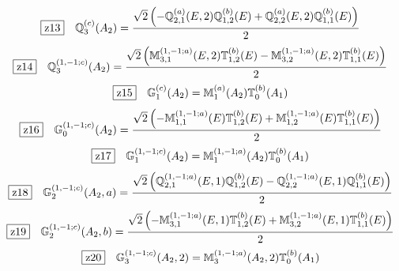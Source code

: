 \documentclass[fleqn,10pt,landscape]{jsarticle}
\begin{document}
\begin{dmath*}
\hspace*{3mm}\fbox{z13}\quad \mathbb{Q}_{3}^{(c)}(A_{2})=\frac{\sqrt{2} \left(- \mathbb{Q}_{2,1}^{(a)}(E,2) \mathbb{Q}_{1,2}^{(b)}(E) + \mathbb{Q}_{2,2}^{(a)}(E,2) \mathbb{Q}_{1,1}^{(b)}(E)\right)}{2}
\end{dmath*}
\begin{dmath*}
\hspace*{3mm}\fbox{z14}\quad \mathbb{Q}_{3}^{(1,-1;c)}(A_{2})=\frac{\sqrt{2} \left(\mathbb{M}_{3,1}^{(1,-1;a)}(E,2) \mathbb{T}_{1,2}^{(b)}(E) - \mathbb{M}_{3,2}^{(1,-1;a)}(E,2) \mathbb{T}_{1,1}^{(b)}(E)\right)}{2}
\end{dmath*}
\begin{dmath*}
\hspace*{3mm}\fbox{z15}\quad \mathbb{G}_{1}^{(c)}(A_{2})=\mathbb{M}_{1}^{(a)}(A_{2}) \mathbb{T}_{0}^{(b)}(A_{1})
\end{dmath*}
\begin{dmath*}
\hspace*{3mm}\fbox{z16}\quad \mathbb{G}_{0}^{(1,-1;c)}(A_{2})=\frac{\sqrt{2} \left(- \mathbb{M}_{1,1}^{(1,-1;a)}(E) \mathbb{T}_{1,2}^{(b)}(E) + \mathbb{M}_{1,2}^{(1,-1;a)}(E) \mathbb{T}_{1,1}^{(b)}(E)\right)}{2}
\end{dmath*}
\begin{dmath*}
\hspace*{3mm}\fbox{z17}\quad \mathbb{G}_{1}^{(1,-1;c)}(A_{2})=\mathbb{M}_{1}^{(1,-1;a)}(A_{2}) \mathbb{T}_{0}^{(b)}(A_{1})
\end{dmath*}
\begin{dmath*}
\hspace*{3mm}\fbox{z18}\quad \mathbb{G}_{2}^{(1,-1;c)}(A_{2},a)=\frac{\sqrt{2} \left(\mathbb{Q}_{2,1}^{(1,-1;a)}(E,1) \mathbb{Q}_{1,2}^{(b)}(E) - \mathbb{Q}_{2,2}^{(1,-1;a)}(E,1) \mathbb{Q}_{1,1}^{(b)}(E)\right)}{2}
\end{dmath*}
\begin{dmath*}
\hspace*{3mm}\fbox{z19}\quad \mathbb{G}_{2}^{(1,-1;c)}(A_{2},b)=\frac{\sqrt{2} \left(- \mathbb{M}_{3,1}^{(1,-1;a)}(E,1) \mathbb{T}_{1,2}^{(b)}(E) + \mathbb{M}_{3,2}^{(1,-1;a)}(E,1) \mathbb{T}_{1,1}^{(b)}(E)\right)}{2}
\end{dmath*}
\begin{dmath*}
\hspace*{3mm}\fbox{z20}\quad \mathbb{G}_{3}^{(1,-1;c)}(A_{2},2)=\mathbb{M}_{3}^{(1,-1;a)}(A_{2},2) \mathbb{T}_{0}^{(b)}(A_{1})
\end{dmath*}
\end{document}

